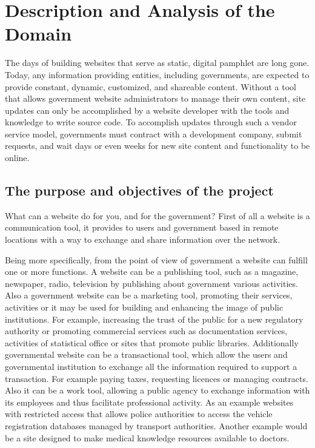 \section{Description and Analysis of the Domain}

The days of building websites that serve as static, digital pamphlet are long gone. Today, any information providing entities, including governments, are expected to provide constant, dynamic, customized, and shareable content. Without a tool that allows government website administrators to manage their own content, site updates can only be accomplished by a website developer with the tools and knowledge to write source code. To accomplish updates through such a vendor service model, governments must contract with a development company, submit requests, and wait days or even weeks for new site content and functionality to be online.

\subsection{The purpose and objectives of the project}
What can a website do for you, and for the government? First of all a website is a communication tool, it provides to users and government based in remote locations with a way to exchange and share information over the network.

Being more specifically, from the point of view of government a website can fulfill one or more functions. A website can be a publishing tool, such as a magazine, newspaper, radio, television by publishing about government various activities. Also a government website can be a marketing tool, promoting their services, activities or it may be used for building and enhancing the image of public institutions. For example, increasing the trust of the public for a new regulatory authority or promoting commercial services such as documentation services, activities of statistical office or sites that promote public libraries. Additionally governmental website can be a transactional tool, which allow the users and governmental institution to exchange all the information required to support a transaction. For example paying taxes, requesting licences or managing contracts. Also it can be a work tool, allowing a public agency to exchange information with its employees and thus facilitate professional activity. As an example websites with restricted access that allows police authorities to access the vehicle registration databases managed by transport authorities. Another example would be a site designed to make medical knowledge resources available to doctors.

